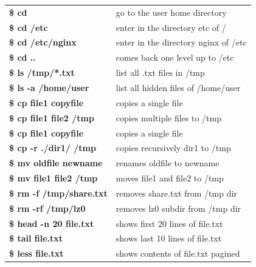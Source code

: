 \documentclass{beamer}
\begin{document}
\begin{frame}[t]
{\begin{minipage}[t]{.25\linewidth}
        \begin{center}
        \end{center}
        
        \begin{tabular}{l p{9cm} }
        \textbf{\$ cd} & go to the user home directory\\
        \textbf{\$ cd /etc} & enter in the directory etc of /\\
        \textbf{\$ cd /etc/nginx} & enter in the directory nginx of /etc\\
        \textbf{\$ cd ..} & comes back one level up to /etc\\
        \textbf{\$ ls /tmp/*.txt} & list all .txt files in /tmp\\
        \textbf{\$ ls -a /home/user} & list all hidden files of /home/user\\
        \textbf{\$ cp file1 copyfile} & copies a single file\\
        \textbf{\$ cp file1 file2 /tmp} & copies multiple files to /tmp\\
        \textbf{\$ cp file1 copyfile} & copies a single file\\
        \textbf{\$ cp -r ./dir1/ /tmp} & copies recursively dir1 to /tmp\\
        \textbf{\$ mv oldfile newname} & renames oldfile to newname\\
        \textbf{\$ mv file1 file2 /tmp} & moves file1 and file2 to /tmp\\
        \textbf{\$ rm -f /tmp/share.txt} & removes share.txt from /tmp dir\\
        \textbf{\$ rm -rf /tmp/lz0} & removes lz0 subdir from /tmp dir\\
        \textbf{\$ head -n 20 file.txt} & shows first 20 lines of file.txt\\
        \textbf{\$ tail file.txt} & shows last 10 lines of file.txt\\
        \textbf{\$ less file.txt} & shows contents of file.txt pagined\\
        \end{tabular}
        
        \vspace{10pt}
        
        \begin{center}
        \end{center}
        

\end{minipage}}
\end{frame}
\end{document}
